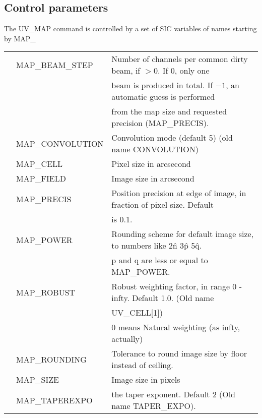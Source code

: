 \documentclass[11pt]{article}
\begin{document}
\subsection{Control parameters}
The UV\_MAP command is controlled by a set of SIC variables of names starting by MAP\_
\begin{tabular}{lll}
& MAP\_BEAM\_STEP &  Number of channels per common dirty beam, if $> 0$. If 0, only one \\
                & & beam is produced in total. If $-1$, an automatic guess is performed \\
                & & from the map size and requested precision (MAP\_PRECIS). \\
& MAP\_CONVOLUTION  &  Convolution mode (default 5) (old name CONVOLUTION) \\
& MAP\_CELL    & Pixel size in arcsecond \\
& MAP\_FIELD   & Image size in arcsecond \\
& MAP\_PRECIS  & Position precision at edge of image, in fraction of pixel size. Default\\
                & & is 0.1. \\
& MAP\_POWER   & Rounding scheme for default image size, to numbers like 2\^n 3\^p 5\^q. \\
  & & p and q are less or equal to MAP\_POWER. \\
& MAP\_ROBUST  &   Robust weighting factor, in range 0 - infty.  Default 1.0. (Old name \\
      &  & UV\_CELL[1]) \\
      &  &  0 means  Natural weighting (as infty, actually) \\
& MAP\_ROUNDING  & Tolerance to round image size by floor instead of ceiling. \\
& MAP\_SIZE     &   Image size in pixels \\
& MAP\_TAPEREXPO &  the taper exponent. Default 2 (Old name TAPER\_EXPO). \\

\end{tabular}
\end{document}

